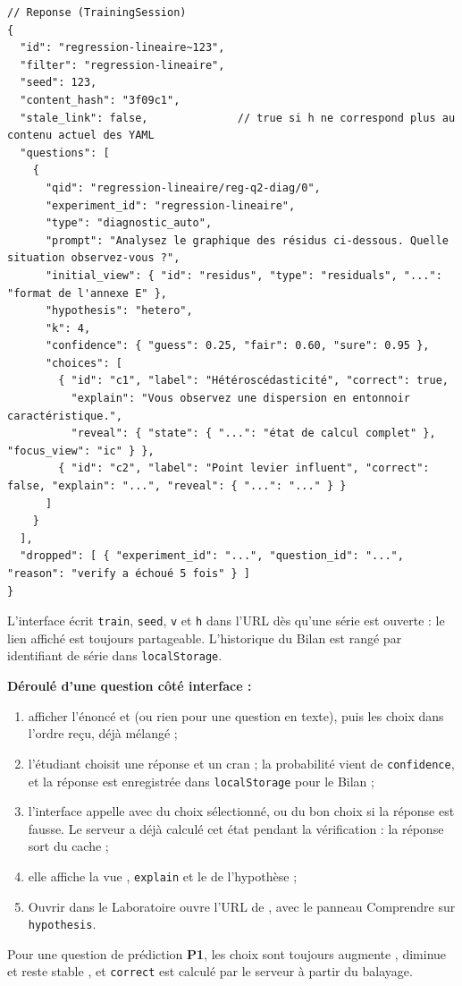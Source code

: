 \documentclass[11pt,a4paper]{article}
\newcommand{\pone}{\colorbox{ctMethod!18}{\footnotesize\textbf{P1}}}
\begin{document}
\begin{appendices}
\begin{lstlisting}[caption={Les deux routes de l'Entraînement et leur réponse commune.}]
// Reponse (TrainingSession)
{
  "id": "regression-lineaire~123",
  "filter": "regression-lineaire",
  "seed": 123,
  "content_hash": "3f09c1",
  "stale_link": false,              // true si h ne correspond plus au contenu actuel des YAML
  "questions": [
    {
      "qid": "regression-lineaire/reg-q2-diag/0",
      "experiment_id": "regression-lineaire",
      "type": "diagnostic_auto",
      "prompt": "Analysez le graphique des résidus ci-dessous. Quelle situation observez-vous ?",
      "initial_view": { "id": "residus", "type": "residuals", "...": "format de l'annexe E" },
      "hypothesis": "hetero",
      "k": 4,
      "confidence": { "guess": 0.25, "fair": 0.60, "sure": 0.95 },
      "choices": [
        { "id": "c1", "label": "Hétéroscédasticité", "correct": true,
          "explain": "Vous observez une dispersion en entonnoir caractéristique.",
          "reveal": { "state": { "...": "état de calcul complet" }, "focus_view": "ic" } },
        { "id": "c2", "label": "Point levier influent", "correct": false, "explain": "...", "reveal": { "...": "..." } }
      ]
    }
  ],
  "dropped": [ { "experiment_id": "...", "question_id": "...", "reason": "verify a échoué 5 fois" } ]
}
\end{lstlisting}

L'interface écrit \texttt{train}, \texttt{seed}, \texttt{v} et \texttt{h} dans l'URL dès qu'une série est ouverte : le lien affiché est toujours partageable. L'historique du Bilan est rangé par identifiant de série dans \texttt{localStorage}.

\textbf{Déroulé d'une question côté interface :}
\begin{enumerate}[leftmargin=*, nosep]
  \item afficher l'énoncé et  (ou rien pour une question en texte), puis les choix dans l'ordre reçu, déjà mélangé ;
  \item l'étudiant choisit une réponse et un cran ; la probabilité vient de \texttt{confidence}, et la réponse est enregistrée dans \texttt{localStorage} pour le Bilan ;
  \item l'interface appelle  avec  du choix sélectionné, ou du bon choix si la réponse est fausse. Le serveur a déjà calculé cet état pendant la vérification : la réponse sort du cache ;
  \item elle affiche la vue , \texttt{explain} et le  de l'hypothèse ;
  \item \og Ouvrir dans le Laboratoire \fg{} ouvre l'URL de , avec le panneau Comprendre sur \texttt{hypothesis}.
\end{enumerate}
Pour une question de prédiction \pone{}, les choix sont toujours \og augmente \fg{}, \og diminue \fg{} et \og reste stable \fg{}, et \texttt{correct} est calculé par le serveur à partir du balayage.


\end{appendices}
\end{document}
